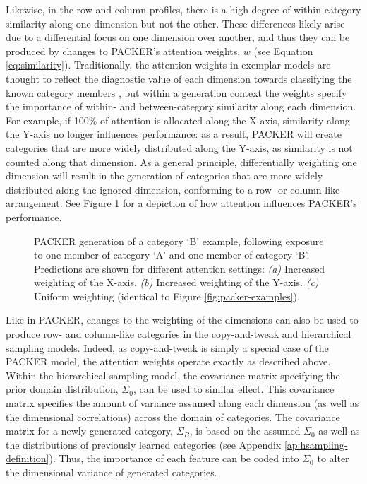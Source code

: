 \documentclass[12pt]{article}
\newcommand\inputpgf[2]{{
\let\pgfimageWithoutPath\pgfimage
\renewcommand{\pgfimage}[2][]{\pgfimageWithoutPath[##1]{#1/##2}}

}}
\begin{document}
\begin{flushleft}
Likewise, in the row and column profiles, there is a high degree of within-category similarity along one dimension but not the other. These differences likely arise due to a differential focus on one dimension over another, and thus they can be produced by changes to PACKER's attention weights, $w$ (see Equation \ref{eq:similarity}). Traditionally, the attention weights in exemplar models are thought to reflect the diagnostic value of each dimension towards classifying the known category members \citep{nosofsky1984choice,nosofsky1986attention,kruschke1992alcove}, but within a generation context the weights specify the importance of within- and between-category similarity along each dimension. For example, if 100\% of attention is allocated along the X-axis, similarity along the Y-axis no longer influences performance: as a result, PACKER will create categories that are more widely distributed along the Y-axis, as similarity is not counted along that dimension. As a general principle, differentially weighting one dimension will result in the generation of categories that are more widely distributed along the ignored dimension, conforming to a row- or column-like arrangement. See Figure \ref{fig:packer-attention} for a depiction of how attention influences PACKER's performance. 

\begin{figure}
    \begin{center}
    \inputpgf{figs/}{packer-attention-examples.pgf}
    \caption{PACKER generation of a category `B' example, following exposure to one member of category `A' and one member of category `B'. Predictions are shown for different attention settings: {\em (a)} Increased weighting of the X-axis. {\em (b)} Increased weighting of the Y-axis. {\em (c)} Uniform weighting (identical to Figure \ref{fig:packer-examples}).}
    \label{fig:packer-attention}
    \end{center}
\end{figure}

Like in PACKER, changes to the weighting of the dimensions can also be used to produce row- and column-like categories in the copy-and-tweak and hierarchical sampling models. Indeed, as copy-and-tweak is simply a special case of the PACKER model, the attention weights operate exactly as described above. Within the hierarchical sampling model, the covariance matrix specifying the prior domain distribution, $\Sigma_0$, can be used to similar effect. This covariance matrix specifies the amount of variance assumed along each dimension (as well as the dimensional correlations) across the domain of categories. The covariance matrix for a newly generated category, $\Sigma_B$, is based on the assumed $\Sigma_0$ as well as the distributions of previously learned categories (see Appendix \ref{ap:hsampling-definition}). Thus, the importance of each feature can be coded into $\Sigma_0$ to alter the dimensional variance of generated categories.


\end{flushleft}
\end{document}

